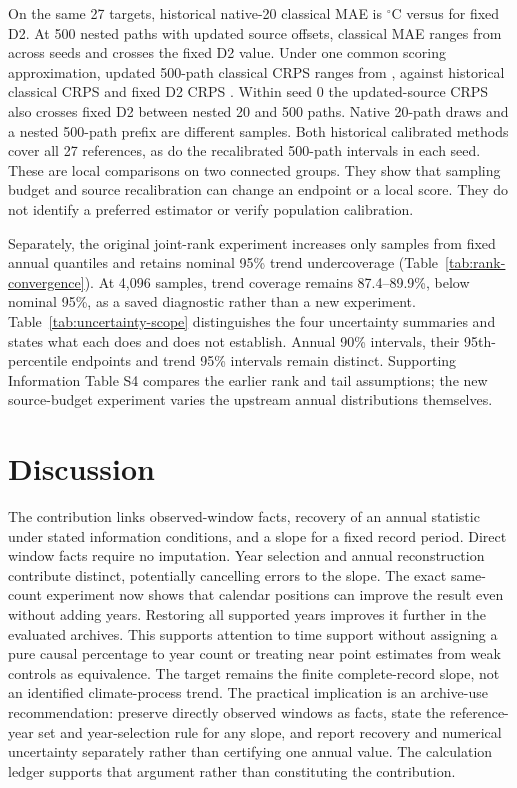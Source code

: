 \documentclass[draft,linenumbers]{agujournal2025}
\makeatletter
\newcommand{\siTableAlias}[2]{%
  \begingroup
  \def\@currentlabel{#2}%
  \label{#1}%
  \endgroup
}
\makeatother
\begin{document}
On the same 27 targets, historical native-20 classical MAE is \PEClassicNativeMAE{}$^{\circ}$C versus \PEDTwoFixedMAE{} for fixed D2. At 500 nested paths with updated source offsets, classical MAE ranges from \PEClassicUpdatedFiveHundredMAERange{} across seeds and crosses the fixed D2 value. Under one common scoring approximation, updated 500-path classical CRPS ranges from \PEClassicUpdatedFiveHundredCRPSRange{}, against historical classical CRPS \PEClassicNativeCRPS{} and fixed D2 CRPS \PEDTwoFixedCRPS{}. Within seed 0 the updated-source CRPS also crosses fixed D2 between nested 20 and 500 paths. Native 20-path draws and a nested 500-path prefix are different samples. Both historical calibrated methods cover all 27 references, as do the recalibrated 500-path intervals in each seed. These are local comparisons on two connected groups. They show that sampling budget and source recalibration can change an endpoint or a local score. They do not identify a preferred estimator or verify population calibration.



Separately, the original joint-rank experiment increases only samples from fixed annual quantiles and retains nominal 95\% trend undercoverage (Table~\ref{tab:rank-convergence}). At 4,096 samples, trend coverage remains 87.4--89.9\%, below nominal 95\%, as a saved diagnostic rather than a new experiment. \siTableAlias{tab:uncertainty-scope}{S69}Table~\ref{tab:uncertainty-scope} distinguishes the four uncertainty summaries and states what each does and does not establish. Annual 90\% intervals, their 95th-percentile endpoints and trend 95\% intervals remain distinct. Supporting Information Table S4 compares the earlier rank and tail assumptions; the new source-budget experiment varies the upstream annual distributions themselves.

\section{Discussion}
The contribution links observed-window facts, recovery of an annual statistic under stated information conditions, and a slope for a fixed record period. Direct window facts require no imputation. Year selection and annual reconstruction contribute distinct, potentially cancelling errors to the slope. The exact same-count experiment now shows that calendar positions can improve the result even without adding years. Restoring all supported years improves it further in the evaluated archives. This supports attention to time support without assigning a pure causal percentage to year count or treating near point estimates from weak controls as equivalence. The target remains the finite complete-record slope, not an identified climate-process trend. The practical implication is an archive-use recommendation: preserve directly observed windows as facts, state the reference-year set and year-selection rule for any slope, and report recovery and numerical uncertainty separately rather than certifying one annual value. The calculation ledger supports that argument rather than constituting the contribution.
\end{document}
